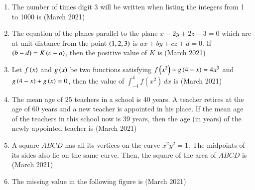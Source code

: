 \documentclass[journal,12pt,onecolumn]{IEEEtran}
\theoremstyle{remark}
\begin{document}
\begin{enumerate}
\begin{enumerate}
\end{enumerate}

  


\item The number of times digit 3 will be written when listing the integers from 1 to 1000 is \underline{\hspace{1cm}}\hfill (March 2021)
\\ 
\item The equation of the planes parallel to the plane $x - 2y + 2z - 3 = 0$ which are at unit distance from the point $\left(1, 2, 3\right)$ is $ax + by + cz + d = 0$. If $\left(b - d\right) = K\left(c - a\right)$, then the positive value of $K$ is \underline{\hspace{1cm}}\hfill (March 2021)
\\
\item Let $f\left(x\right)$ and $g\left(x\right)$ be two functions satisfying $f\left(x^2\right) + g\left(4 - x\right) = 4x^3$ and $g\left(4 - x\right) + g\left(x\right) = 0$, then the value of $\int_{-4}^{4} f(x^2) \, dx$ is \underline{\hspace{1cm}}\hfill (March 2021)
\\
\item The mean age of 25 teachers in a school is 40 years. A teacher retires at the age of 60 years and a new teacher is appointed in his place. If the mean age of the teachers in this school now is 39 years, then the age (in years) of the newly appointed teacher is \underline{\hspace{1cm}}\hfill (March 2021)
\\

\item A square $ABCD$ has all its vertices on the curve $x^2y^2 = 1$. The midpoints of its sides also lie on the same curve. Then, the square of the area of $ABCD$ is \underline{\hspace{1cm}}\hfill (March 2021)
\\
\item The missing value in the following figure is \underline{\hspace{1cm}}\hfill (March 2021)



 \begin{center}
     

\end{center}
\end{enumerate}
\end{document}
